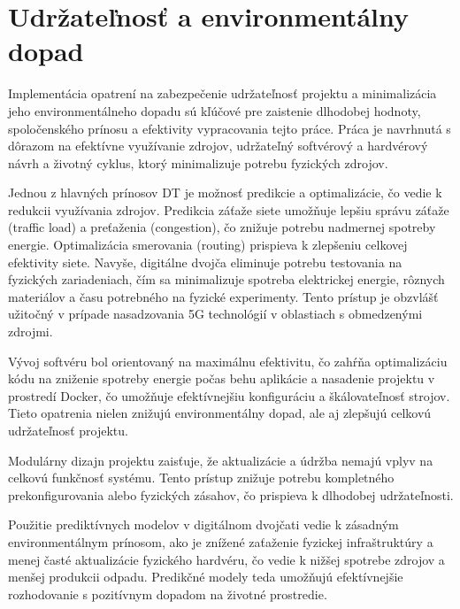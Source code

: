 \section{Udržateľnosť a environmentálny dopad}
\par{
Implementácia opatrení na zabezpečenie udržateľnosť projektu a minimalizácia jeho environmentálneho dopadu sú kľúčové pre zaistenie dlhodobej hodnoty, spoločenského prínosu a efektivity vypracovania tejto práce. Práca je navrhnutá s dôrazom na efektívne využívanie zdrojov, udržateľný softvérový a hardvérový návrh a životný cyklus, ktorý minimalizuje potrebu fyzických zdrojov.
}

\par{
Jednou z hlavných prínosov DT je možnosť predikcie a optimalizácie, čo vedie k redukcii využívania zdrojov. Predikcia záťaže siete umožňuje lepšiu správu záťaže (traffic load) a preťaženia (congestion), čo znižuje potrebu nadmernej spotreby energie. Optimalizácia smerovania (routing) prispieva k zlepšeniu celkovej efektivity siete. Navyše, digitálne dvojča eliminuje potrebu testovania na fyzických zariadeniach, čím sa minimalizuje spotreba elektrickej energie, rôznych materiálov a času potrebného na fyzické experimenty. Tento prístup je obzvlášť užitočný v prípade nasadzovania 5G technológií v oblastiach s obmedzenými zdrojmi.
}

\par{
Vývoj softvéru bol orientovaný na maximálnu efektivitu, čo zahŕňa optimalizáciu kódu na zniženie spotreby energie počas behu aplikácie a nasadenie projektu v prostredí Docker, čo umožňuje efektívnejšiu konfiguráciu a škálovateľnosť strojov. Tieto opatrenia nielen znižujú environmentálny dopad, ale aj zlepšujú celkovú udržateľnosť projektu.
}

\par{
Modulárny dizajn projektu zaisťuje, že aktualizácie a údržba nemajú vplyv na celkovú funkčnosť systému. Tento prístup znižuje potrebu kompletného prekonfigurovania alebo fyzických zásahov, čo prispieva k dlhodobej udržateľnosti.
}

\par{
Použitie prediktívnych modelov v digitálnom dvojčati vedie k zásadným environmentálnym prínosom, ako je znížené zaťaženie fyzickej infraštruktúry a menej časté aktualizácie fyzického hardvéru, čo vedie k nižšej spotrebe zdrojov a menšej produkcii odpadu. Predikčné modely teda umožňujú efektívnejšie rozhodovanie s pozitívnym dopadom na životné prostredie.
}



